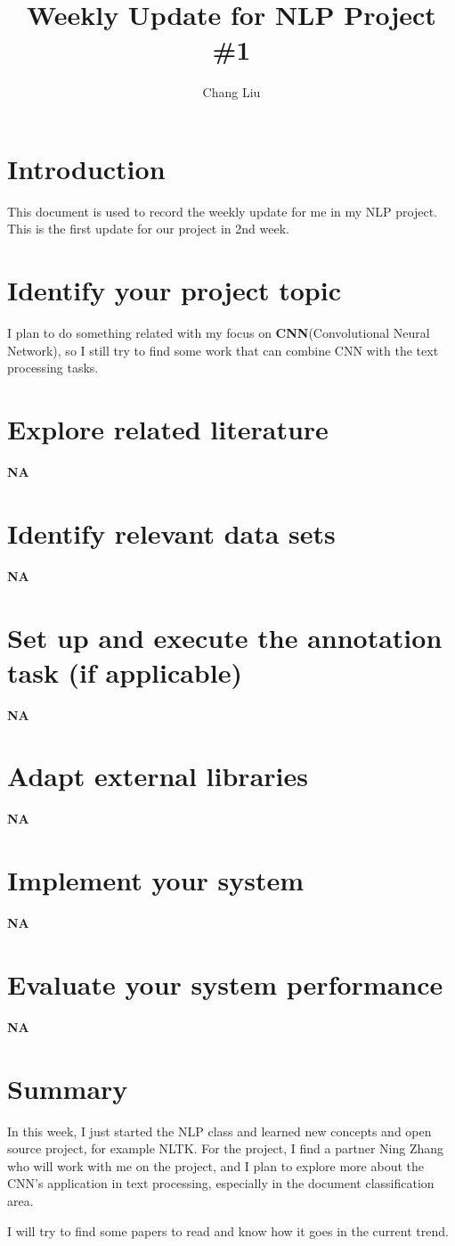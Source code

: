 \documentclass{article}
\title{Weekly Update for NLP Project \#1}
\author{Chang Liu}
\date{\datedate}
\begin{document}
\maketitle

\section{Introduction}


This document is used to record the weekly update for me in my NLP project. This is the first update for our project in 2nd week.

\section{Identify your project topic}

I plan to do something related with my focus on \textbf{CNN}(Convolutional Neural Network), so I still try to find some work that can combine CNN with the text processing tasks.

\section{Explore related literature} 
\textbf{NA}


\section{Identify relevant data sets}

\textbf{NA}



\section{Set up and execute the annotation task (if applicable)} 
\textbf{NA}



\section{Adapt external libraries}
\textbf{NA}


\section{Implement your system}
\textbf{NA}


\section{Evaluate your system performance}
\textbf{NA}

\section{Summary}

In this week, I just started the NLP class and learned new concepts and open source project, for example NLTK. For the project, I find a partner Ning Zhang who will work with me on the project, and I plan to explore more about the CNN's application in text processing, especially in the document classification area.

I will try to find some papers to read and know how it goes in the current trend.
\end{document}
